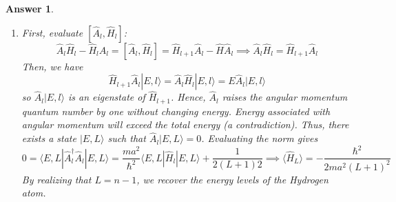 \documentclass[a4paper]{article}
\newtheorem{ans}{Answer}[subsection]
\theoremstyle{new}
\begin{document}
\begin{ans}
\begin{enumerate}[label=(\alph*)]
\begin{enumerate}[label=(\roman*)]
    \item 
    $$[\hat{A}_l,\hat{A}_l^\dag]=\frac{a^2}{2}\bigg[\frac{i}{\hbar}\hat{p}_r+\frac{1}{(l+1)a}-\frac{l+1}{r},-\frac{i}{\hbar}\hat{p}_r+\frac{1}{(l+1)a}-\frac{l+1}{r}\bigg]=-\frac{a^2}{2}\frac{i}{\hbar}(l+1)2[\hat{p}_r,r^{-1}]=\frac{(l+1)a^2}{r^2}$$
    where we used result from part (a)(iii). But, $\hat{H}_{l+1}-\hat{H}_l=\frac{\hbar^2}{2mr^2}[(l+1)(l+2)-l(l+1)]=\frac{\hbar^2}{m}\frac{l+1}{r^2}$, then we recover the desired relation.
    \item 
    $$[\hat{A}_l,\hat{H}_l]=[\hat{A}_l,\hat{A}_l^\dag\hat{A}_l]\frac{\hbar^2}{ma^2}=[\hat{A}_l,\hat{A}_l^\dag]\hat{A}_l\frac{\hbar^2}{ma^2}=\frac{(l+1)}{r^2}\frac{\hbar^2}{m}\hat{A}_l=(\hat{H}_{l+1}-\hat{H}_l)\hat{A}_l$$
    where we used results from part (c) and (d)(i).
\end{enumerate}
\item First, evaluate $[\hat{A}_l,\hat{H}_l]$:
$$\hat{A}_l\hat{H}_l-\hat{H}_l\hat{A}_l=[\hat{A}_l,\hat{H}_l]=\hat{H}_{l+1}\hat{A}_l-\hat{H}\hat{A}_l\implies\hat{A}_l\hat{H}_l=\hat{H}_{l+1}\hat{A}_l$$
Then, we have
$$\hat{H}_{l+1}\hat{A}_l|E,l\rangle=\hat{A}_l\hat{H}_l|E,l\rangle=E\hat{A}_l|E,l\rangle$$
so $\hat{A}_l|E,l\rangle$ is an eigenstate of $\hat{H}_{l+1}$. Hence, $\hat{A}_l$ raises the angular momentum quantum number by one without changing energy. Energy associated with angular momentum will exceed the total energy (a contradiction). Thus, there exists a state $|E,L\rangle$ such that $\hat{A}_l|E,L\rangle=0$. Evaluating the norm gives
$$0=\langle E,L|\hat{A}_l^\dag\hat{A}_l|E,L\rangle=\frac{ma^2}{\hbar^2}\langle E,L|\hat{H}_l|E,L\rangle+\frac{1}{2(L+1)2}\implies\langle\hat{H}_L\rangle=-\frac{\hbar^2}{2ma^2(L+1)^2}$$
By realizing that $L=n-1$, we recover the energy levels of the Hydrogen atom.
\end{enumerate}
\end{ans}
\newpage
\end{document}
